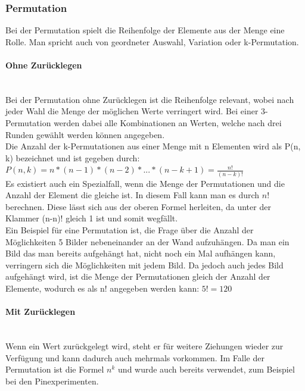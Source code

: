 \documentclass{article}
\newcommand{\paragraphlb}[1]{\paragraph{#1}\mbox{}\\}
\begin{document}
	\subsubsection{Permutation}
	Bei der Permutation spielt die Reihenfolge der Elemente aus der Menge eine Rolle. Man spricht auch von geordneter Auswahl, Variation oder k-Permutation. 
	\paragraphlb{Ohne Zurücklegen}
	Bei der Permutation ohne Zurücklegen ist die Reihenfolge relevant, wobei nach jeder Wahl die Menge der möglichen Werte verringert wird. Bei einer 3-Permutation werden dabei alle Kombinationen an Werten, welche nach drei Runden gewählt werden können angegeben. \\
	Die Anzahl der k-Permutationen aus einer Menge mit n Elementen wird als P(n, k) bezeichnet und ist gegeben durch: $P(n, k)=n*(n-1)*(n-2)*...*(n-k+1)=\frac{n!}{(n-k)!}$ \\
	Es existiert auch ein Spezialfall, wenn die Menge der Permutationen und die Anzahl der Element die gleiche ist. In diesem Fall kann man es durch $n!$ berechnen. Diese lässt sich aus der oberen Formel herleiten, da unter der Klammer (n-n)! gleich 1 ist und somit wegfällt. \\
	Ein Beispiel für eine Permutation ist, die Frage über die Anzahl der Möglichkeiten 5 Bilder nebeneinander an der Wand aufzuhängen. Da man ein Bild das man bereits aufgehängt hat, nicht noch ein Mal aufhängen kann, verringern sich die Möglichkeiten mit jedem Bild. Da jedoch auch jedes Bild aufgehängt wird, ist die Menge der Permutationen gleich der Anzahl der Elemente, wodurch es als n! angegeben werden kann: $5!=120$
	\paragraphlb{Mit Zurücklegen}
	Wenn ein Wert zurückgelegt wird, steht er für weitere Ziehungen wieder zur Verfügung und kann dadurch auch mehrmals vorkommen. Im Falle der Permutation ist die Formel $n^k$ und wurde auch bereits verwendet, zum Beispiel bei den Pinexperimenten.
\end{document}
